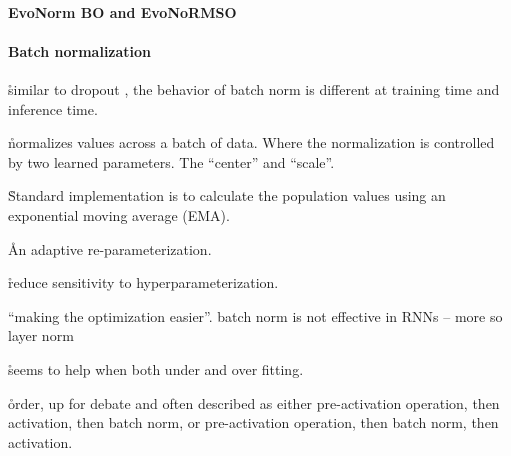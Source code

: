 

\paragraph{EvoNorm BO and EvoNoRMSO}




\paragraph{Batch normalization}




\r{similar to dropout \ALR, the behavior of batch norm is different at training time and inference time.}

\r{normalizes values across a batch of data. Where the normalization is controlled by two learned parameters. The ``center'' and ``scale''.}

\r{Standard implementation is to calculate the population values using an exponential moving average (EMA).}



\r{An adaptive re-parameterization.}

\r{reduce sensitivity to hyperparameterization.}


\r{``making the optimization easier''. batch norm is not effective in RNNs -- more so layer norm}

\r{seems to help when both under and over fitting.}

\r{order, up for debate and often described as either pre-activation operation, then activation, then batch norm, or pre-activation operation, then batch norm, then activation.}

